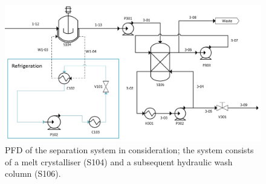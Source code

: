 \begin{figure}[h]
    \centering
    \includegraphics[scale=0.6]{chapters/3-separation/figures/Crystallizer PFD.jpg}
    \caption{PFD of the separation system in consideration; the system consists of a melt crystalliser (S104) and a subsequent hydraulic wash column (S106).}
    \label{fig:separator PFD}
\end{figure}